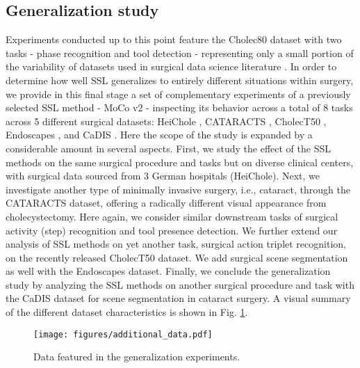 \documentclass[times,twocolumn,final]{elsarticle}
\begin{document}
{\color{newtext} \subsection{Generalization study}
\label{sec:generalization}
\textcolor{changetext1}{Experiments conducted up to this point feature the Cholec80 dataset with two tasks - phase recognition and tool detection} \textcolor{newtext1}{- representing only a small portion of the variability of datasets used in surgical data science literature \citep{sds_2}}. In order to determine how well SSL generalizes to entirely different situations within surgery, we provide in this final stage a set of complementary experiments of a previously selected SSL method - MoCo v2 - inspecting its behavior across a total of 8 tasks across 5 different surgical datasets: HeiChole \citep{heichole}, CATARACTS \citep{Cataracts2018}, CholecT50 \citep{nwoye2019weakly}, Endoscapes \citep{endoscapes}, and CaDIS \citep{cadis}. Here the scope of the study is expanded by a considerable amount in several aspects. 
First, we study the effect of the SSL methods on the same surgical procedure and tasks but on diverse clinical centers, with surgical data sourced from 3 German hospitals (HeiChole).
Next, we investigate another type of minimally invasive surgery, i.e., cataract, through the CATARACTS dataset, offering a radically different visual appearance from cholecystectomy. Here again, we consider similar downstream tasks of surgical activity (step) recognition and tool presence detection. 
We further extend our analysis of SSL methods on yet another task, surgical action triplet recognition, on the recently released CholecT50 dataset. We add surgical scene segmentation as well with the Endoscapes dataset. 
Finally, we conclude the generalization study by analyzing the SSL methods on another surgical procedure and task with the CaDIS dataset for scene segmentation in cataract surgery.
A visual summary of the different dataset characteristics is shown in Fig. \ref{fig:additional_datasets}.}

\begin{figure}[ht]
\centering
\texttt{[image: figures/additional\_data.pdf]}
\caption{{\color{newtext} Data featured in the generalization experiments.}}
\label{fig:additional_datasets}
\end{figure}
\end{document}
